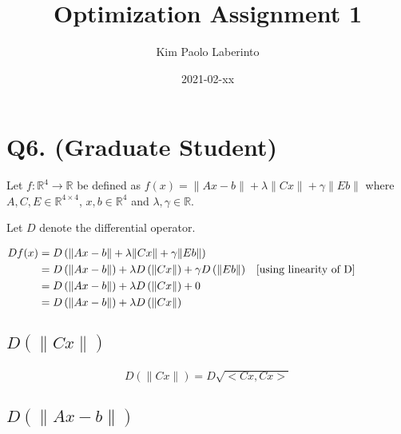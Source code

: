 \documentclass{article}
\title{Optimization Assignment 1}
\date{2021-02-xx}
\author{Kim Paolo Laberinto}
\begin{document}
    \maketitle
    \newpage

    \section{Q6. (Graduate Student)}

    Let $f: \mathbb{R}^4 \rightarrow \mathbb{R}$ be defined as $f(x) = \| Ax - b \| + \lambda \| Cx \| + \gamma \| Eb \|$ where $A, C, E \in \mathbb{R}^{4 \times 4}$, $x,b \in \mathbb{R}^4$ and $\lambda,\gamma \in \mathbb{R}$.

    Let $D$ denote the differential operator.

    \begin{align*}
    Df(x) &= D \left( \| Ax - b \| + \lambda \| Cx \| + \gamma \| Eb \| \right) &\\
    &= D \left( \| Ax - b \| \right) +  \lambda D \left( \| Cx \| \right) +  \gamma D \left( \| Eb \| \right) & \parbox[c]{0.4\linewidth}{[using linearity of D]}\\
    &= D \left( \| Ax - b \| \right) +  \lambda D \left( \| Cx \| \right) +  0 &\\
    &= D \left( \| Ax - b \| \right) +  \lambda D \left( \| Cx \| \right) &\\
    \end{align*}

    \subsection{ $D \left(\| Cx \| \right)$ }

    \begin{align*}
        D\left( \| Cx \| \right) = D \sqrt{<Cx, Cx>}
    \end{align*}

    \subsection{ $D \left( \| Ax-b \| \right)$ }
\end{document}
